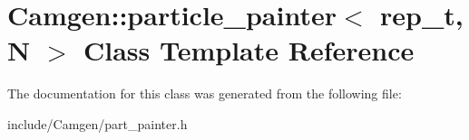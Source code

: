 \hypertarget{a00404}{}\section{Camgen\+:\+:particle\+\_\+painter$<$ rep\+\_\+t, N $>$ Class Template Reference}
\label{a00404}


The documentation for this class was generated from the following file\+:\begin{DoxyCompactItemize}
\item 
include/\+Camgen/part\+\_\+painter.\+h\end{DoxyCompactItemize}
